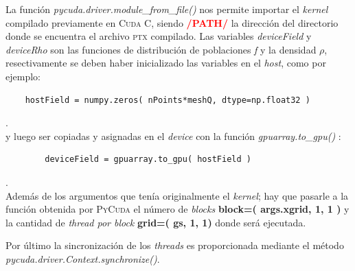 La función \textit{pycuda.driver.module\_from\_file()} nos permite importar el \textit{kernel} compilado previamente en \textsc{Cuda C}, siendo \textcolor{red}{\textbf{/PATH/}} la dirección del directorio donde se encuentra el archivo \textsc{ptx} compilado. Las variables \textit{deviceField} y \textit{deviceRho} son las funciones de distribución de poblaciones \textit{f} y la densidad $\rho$, resectivamente se deben haber inicializado las variables en el \textit{host}, como por ejemplo:
{\footnotesize
	\begin{frame}{}
		\begin{lstlisting}
	hostField = numpy.zeros( nPoints*meshQ, dtype=np.float32 ) 
		\end{lstlisting}
		
	\end{frame}
}.
\\
y luego ser copiadas y asignadas en el  \textit{device} con la función \textit{gpuarray.to\_gpu()} :
{\footnotesize
	\begin{frame}{}
		\begin{lstlisting}
		deviceField = gpuarray.to_gpu( hostField )
		\end{lstlisting}
		
	\end{frame}
}.
\\
Además de los argumentos que tenía originalmente el \textit{kernel}; hay que pasarle a la función obtenida por \textsc{PyCuda} el número de \textit{blocks} \textbf{block=( args.xgrid, 1, 1 )} y la cantidad de \textit{thread por block} \textbf{grid=( gs, 1, 1)} donde será ejecutada. 

Por último la sincronización de los \textit{threads} es proporcionada mediante el método \\
\textit{pycuda.driver.Context.synchronize()}.

